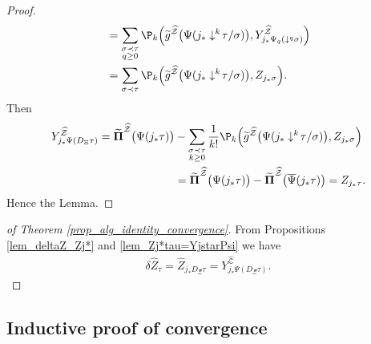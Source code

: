 \documentclass[11pt]{preprint}
\newcommand{\mcZ}{\mathcal{Z}}
\def\PPi{\boldsymbol{\Pi}}
\begin{document}
\begin{proof}
\begin{align*}
	&=
		\sum_{\substack{\sigma\prec\tau \\ q\geq 0}}\P_k\Big(  \widetilde{g}^{\widehat{\mcZ}}\big(   \Psi(j_*\downarrow^k\!\tau/\sigma) \big) , Y^{\widehat{\mcZ}}_{j_*\Psi_q(\downarrow^q\sigma)}   \Big)
		\\
		&=	\sum_{\substack{\sigma\prec\tau }}\P_k\Big(  \widetilde{g}^{\widehat{\mcZ}}\big(   \Psi(j_*\downarrow^k\!\tau/\sigma) \big) , Z_{j_*\sigma}  \Big).
\end{align*}
Then 
\begin{align*}
	Y^{{\widehat{\mcZ}}}_{j_*\Psi(D_\Xi\tau)} = \widetilde{\PPi}^{{\widehat{\mcZ}}}\big(\Psi(j_*\tau)\big) &- \sum_{\substack{\sigma\prec\tau \\ k \geq 0 }}\frac{1}{k!}\P_k\Big(  \widetilde{g}^{\widehat{\mcZ}}\big(   \Psi(j_*\downarrow^k\!\tau/\sigma) \big) , Z_{j_*\sigma}  \Big)
	\\
	&= \widetilde{\PPi}^{{\widehat{\mcZ}}}\big(\Psi(j_*\tau)\big) - \widetilde{\PPi}^{{\widehat{\mcZ}}}\big(\overline\Psi(j_*\tau)\big) = Z_{j_*\tau}.
\end{align*}
Hence the Lemma.
\end{proof}

\begin{proof}[of Theorem \ref{prop_alg_identity_convergence}]
From Propositions \ref{lem_deltaZ_Zj*} and \ref{lem_Zj*tau=YjstarPsi} we have
\begin{align*}
	\delta \widehat{Z}_\tau = \widehat{Z}_{j_*D_\Xi\tau} = Y^{\widehat{\mcZ}}_{j_*\Psi(D_\Xi\tau)}.
\end{align*}

\end{proof}



\subsection{Inductive proof of convergence}
\end{document}
